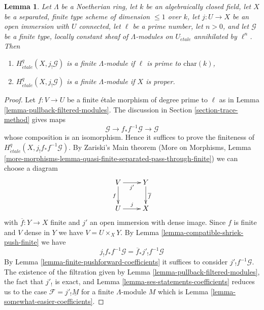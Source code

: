\documentclass[10pt,a4paper]{amsart}
\theoremstyle{plain}
\newtheorem{lemma}[subsection]{Lemma}
\theoremstyle{definition}
\theoremstyle{remark}
\numberwithin{equation}{subsection}
\def\etale{{\acute{e}tale}}
\begin{document}
\begin{lemma}
\label{lemma-vanishing-easier-coefficients}
Let $\Lambda$ be a Noetherian ring, let $k$ be an algebraically closed field,
let $X$ be a separated, finite type scheme of dimension $\leq 1$ over $k$,
let $j : U \to X$ be an open immersion with $U$ connected, let
$\ell$ be a prime number, let $n > 0$, and let $\mathcal{G}$ be a finite type,
locally constant sheaf of $\Lambda$-modules on $U_\etale$ annihilated by
$\ell^n$. Then
\begin{enumerate}
\item $H^q_\etale(X, j_!\mathcal{G})$ is a finite $\Lambda$-module
if $\ell$ is prime to $\text{char}(k)$,
\item $H^q_\etale(X, j_!\mathcal{G})$ is a finite $\Lambda$-module
if $X$ is proper.
\end{enumerate}
\end{lemma}

\begin{proof}
Let $f : V \to U$ be a finite \'etale morphism of degree prime to $\ell$
as in Lemma \ref{lemma-pullback-filtered-modules}. The discussion in
Section \ref{section-trace-method} gives maps
$$
\mathcal{G} \to f_*f^{-1}\mathcal{G} \to \mathcal{G}
$$
whose composition is an isomorphism. Hence it suffices to prove the
finiteness of $H^q_\etale(X, j_!f_*f^{-1}\mathcal{G})$.
By Zariski's Main theorem
(More on Morphisms, Lemma
\ref{more-morphisms-lemma-quasi-finite-separated-pass-through-finite})
we can choose a diagram
$$
\xymatrix{
V \ar[r]_{j'} \ar[d]_f & Y \ar[d]^{\overline{f}} \\
U \ar[r]^j & X
}
$$
with $\overline{f} : Y \to X$ finite and $j'$ an open immersion with
dense image. Since $f$ is finite and $V$ dense in $Y$ we have
$V = U \times_X Y$. By Lemma \ref{lemma-compatible-shriek-push-finite} we have
$$
j_!f_*f^{-1}\mathcal{G} = \overline{f}_*j'_!f^{-1}\mathcal{G}
$$
By Lemma \ref{lemma-finite-pushforward-coefficients} it suffices to
consider $j'_!f^{-1}\mathcal{G}$. The existence of the filtration given by
Lemma \ref{lemma-pullback-filtered-modules},
the fact that $j'_!$ is exact, and
Lemma \ref{lemma-ses-statements-coefficients}
reduces us to the case
$\mathcal{F} = j'_!\underline{M}$ for a finite $\Lambda$-module $M$
which is Lemma \ref{lemma-somewhat-easier-coefficients}.
\end{proof}
\end{document}
